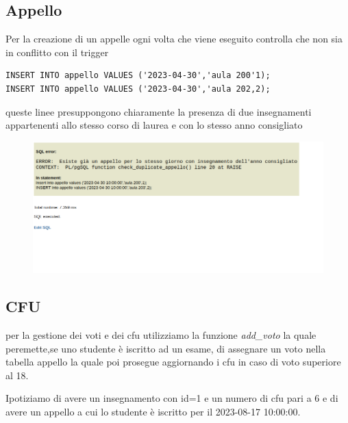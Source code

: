 \subsection{Appello}
Per la creazione di un appelle ogni volta che viene eseguito controlla che non sia in conflitto con il trigger
\begin{lstlisting}[style=sqlStyle]
INSERT INTO appello VALUES ('2023-04-30','aula 200'1);
INSERT INTO appello VALUES ('2023-04-30','aula 202,2);
\end{lstlisting}
queste linee presuppongono chiaramente la presenza di due insegnamenti appartenenti allo stesso corso di laurea e con lo stesso anno consigliato 
\begin{figure}[ht]
    \centering
    \includegraphics[width=0.9\linewidth]{images/sovrapposizione.png}
    \label{err:sovrapposizioneAppello}
\end{figure}
\subsection{CFU}
per la gestione dei voti e dei cfu utilizziamo la funzione \textit{add\_voto} la quale peremette,se uno studente è iscritto ad un esame, di assegnare un voto nella tabella appello la quale poi prosegue aggiornando i cfu in caso di voto superiore al 18.

Ipotiziamo di avere un insegnamento con id=1 e un numero di cfu pari a 6 e di avere un appello a cui lo studente è iscritto per il 2023-08-17 10:00:00. 

